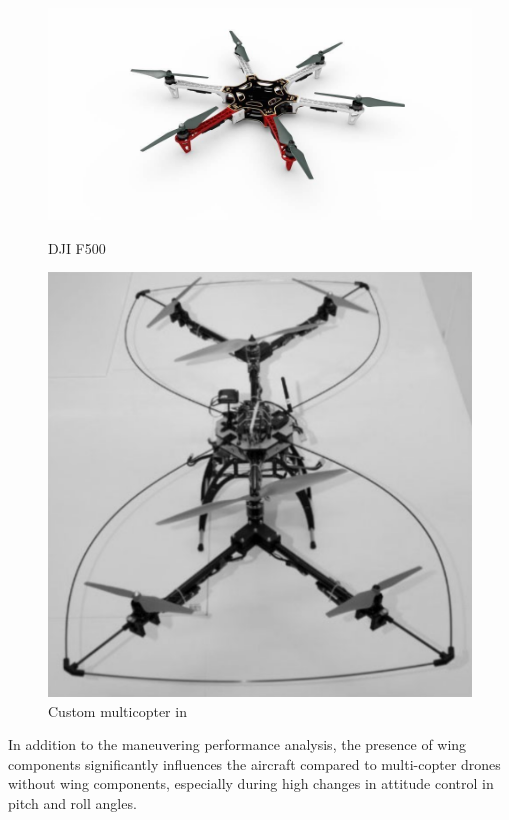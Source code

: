 \begin{figure}
  \centering
  \begin{minipage}[t]{0.55\textwidth}
    \centering
    \includegraphics[width=\linewidth]{Images/DJI F550.jpg}
    \caption{DJI F500}
    \label{fig:DJI F500}
  \end{minipage}
  \hfil
  \begin{minipage}[t]{0.35\textwidth}
    \centering
    \includegraphics[width=\linewidth]{Images/Compound UAV.png}
    \caption{Custom multicopter in \cite{Verbeke}}
    \label{fig:Compound drone}
  \end{minipage}
\end{figure}

In addition to the maneuvering performance analysis, the presence of wing components significantly influences the aircraft compared to multi-copter drones without wing components, especially during high changes in attitude control in pitch and roll angles.

